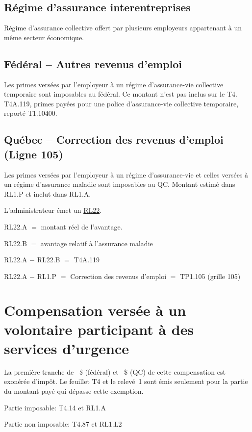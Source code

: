 \subsection{Régime d'assurance interentreprises}
Régime d’assurance collective offert par plusieurs employeurs appartenant à un même secteur économique.
\subsection{Fédéral -- Autres revenus d'emploi}
Les primes versées par l’employeur à un régime d’assurance-vie collective
temporaire sont imposables au fédéral. Ce montant n'est pas inclus sur le T4. T4A.119, primes payées pour une police d'assurance-vie collective temporaire, reporté T1.10400.
\subsection{Québec -- Correction des revenus d’emploi (Ligne 105)}
Les primes versées par l’employeur à un régime d’assurance-vie et celles versées à un régime d’assurance maladie sont imposables au QC. Montant estimé dans RL1.P et inclut dans RL1.A.

L'administrateur émet un \href{https://www.revenuquebec.ca/fr/services-en-ligne/formulaires-et-publications/details-courant/rl-22/}{RL22}.

RL22.A $=$ montant réel de l'avantage.

RL22.B $=$ avantage relatif à l'assurance maladie

RL22.A $-$ RL22.B $=$ T4A.119

RL22.A $-$ RL1.P $=$ Correction des revenus d’emploi $=$ TP1.105 (grille 105)
\section{Compensation versée à un volontaire participant à des services d'urgence}
La première tranche de ~\$ (fédéral) et ~\$ (QC) de cette compensation est exonérée d’impôt. Le feuillet T4 et le relevé~1 sont émis seulement pour la partie du montant payé qui dépasse cette exemption.

Partie imposable: T4.14 et RL1.A

Partie non imposable: T4.87 et RL1.L2
